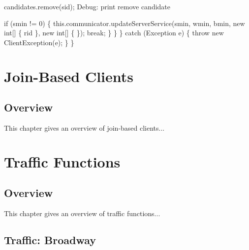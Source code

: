       candidates.remove(sid);
      \LA{}Debug: print remove candidate~{\nwtagstyle{}}\RA{}

      if (smin != 0) \{
        this.communicator.updateServerService(smin, wmin, bmin,
            new int[] \{ rid \}, new int[] \{ \});
        break;
      \}
    \}
  \} catch (Exception e) \{
    throw new ClientException(e);
  \}
\}
\nwendcode{}\nwdocspar
\nwenddocs{}\part{Join-Based Clients}
\label{part-join}

\chapter{Overview}
\label{join-overview}

This chapter gives an overview of join-based clients...

\nwenddocs{}\part{Traffic Functions}
\label{part-traffic}

\chapter{Overview}
\label{traffic-overview}

This chapter gives an overview of traffic functions...

\nwenddocs{}\chapter{Traffic: Broadway}

